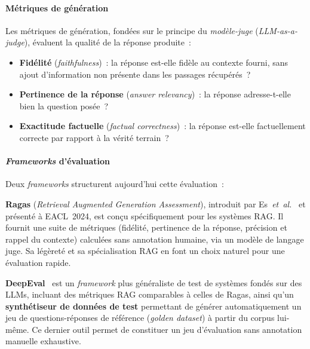 \documentclass[11pt,a4paper]{article}
\begin{document}
\paragraph{Métriques de génération}

Les métriques de génération, fondées sur le principe du \textit{modèle-juge} (\textit{LLM-as-a-judge}), évaluent la qualité de la réponse produite~:
\begin{itemize}
  \item \textbf{Fidélité} (\textit{faithfulness})~: la réponse est-elle fidèle au contexte fourni, sans ajout d'information non présente dans les passages récupérés~?
  \item \textbf{Pertinence de la réponse} (\textit{answer relevancy})~: la réponse adresse-t-elle bien la question posée~?
  \item \textbf{Exactitude factuelle} (\textit{factual correctness})~: la réponse est-elle factuellement correcte par rapport à la vérité terrain~?
\end{itemize}

\paragraph{\textit{Frameworks} d'évaluation}

Deux \textit{frameworks} structurent aujourd'hui cette évaluation~:

\textbf{Ragas} (\textit{Retrieval Augmented Generation Assessment}), introduit par Es~\textit{et~al.}~\cite{es2024ragas} et présenté à EACL~2024, est conçu spécifiquement pour les systèmes RAG. Il fournit une suite de métriques (fidélité, pertinence de la réponse, précision et rappel du contexte) calculées sans annotation humaine, via un modèle de langage juge. Sa légèreté et sa spécialisation RAG en font un choix naturel pour une évaluation rapide.

\textbf{DeepEval}~\cite{deepeval2024} est un \textit{framework} plus généraliste de test de systèmes fondés sur des LLMs, incluant des métriques RAG comparables à celles de Ragas, ainsi qu'un \textbf{synthétiseur de données de test} permettant de générer automatiquement un jeu de questions-réponses de référence (\textit{golden dataset}) à partir du corpus lui-même. Ce dernier outil permet de constituer un jeu d'évaluation sans annotation manuelle exhaustive.
\end{document}
